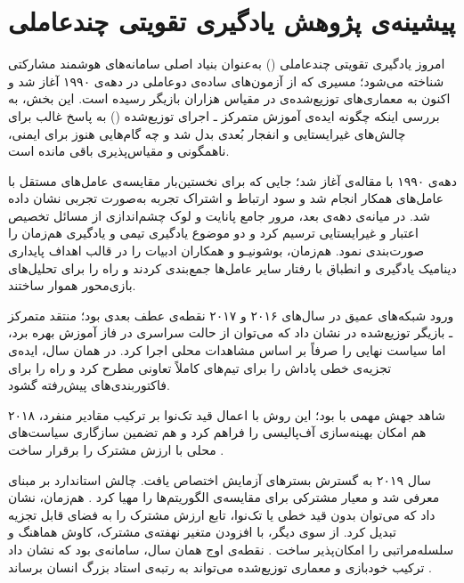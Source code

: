 \section{پیشینه‌ی پژوهش یادگیری تقویتی چندعاملی}\label{sec:marl_lit}

امروز یادگیری تقویتی چندعاملی () به‌عنوان بنیاد اصلی سامانه‌های هوشمند مشارکتی شناخته می‌شود؛ مسیری که از آزمون‌های ساده‌ی دو‌عاملی در دهه‌ی ۱۹۹۰ آغاز شد و اکنون به معماری‌های توزیع‌شده‌ی در مقیاس هزاران بازیگر رسیده است. این بخش، به بررسی اینکه چگونه ایده‌ی {آموزش متمرکز ـ اجرای توزیع‌شده} () به پاسخ غالب برای چالش‌های غیرایستایی و انفجار بُعدی بدل شد و چه گام‌هایی هنوز برای ایمنی، ناهمگونی و مقیاس‌پذیری باقی مانده است.

دهه‌ی ۱۹۹۰ با مقاله‌ی \cite{Tan1993} آغاز شد؛ جایی که برای نخستین‌بار مقایسه‌ی عامل‌های مستقل با عامل‌های همکار انجام شد و سود ارتباط و اشتراک تجربه به‌صورت تجربی نشان داده شد. در میانه‌ی دهه‌ی بعد، مرور جامع پانایت و لوک \cite{Panait2005} چشم‌اندازی از مسائل تخصیص اعتبار و غیرایستایی ترسیم کرد و دو موضوع یادگیری تیمی و یادگیری هم‌زمان را صورت‌بندی نمود.  هم‌زمان، بوشونیـو و همکاران \cite{Busoniu2008} ادبیات  را در قالب اهداف پایداری دینامیک یادگیری و انطباق با رفتار سایر عامل‌ها جمع‌بندی کردند و راه را برای تحلیل‌های بازی‌محور هموار ساختند. 

ورود شبکه‌های عمیق در سال‌های ۲۰۱۶ و ۲۰۱۷ نقطه‌ی عطف بعدی بود؛ منتقد متمرکز ـ بازیگر توزیع‌شده در  \cite{Lowe2017} نشان داد که می‌توان از حالت سراسری در فاز آموزش بهره برد، اما سیاست نهایی را صرفاً بر اساس مشاهدات محلی اجرا کرد.  در همان سال، 
\cite{Sunehag2017} ایده‌ی تجزیه‌ی خطی پاداش را برای تیم‌های کاملاً تعاونی مطرح کرد و راه را برای فاکتوربندی‌های پیش‌رفته گشود. 

۲۰۱۸ شاهد جهش مهمی با  بود؛ این روش با اعمال قید تک‌نوا
 بر ترکیب مقادیر منفرد، هم امکان بهینه‌سازی آف‌پالیسی را فراهم کرد و هم تضمین سازگاری سیاست‌های محلی با ارزش مشترک را برقرار ساخت \cite{Rashid2018}. 

سال ۲۰۱۹ به گسترش بسترهای آزمایش اختصاص یافت. چالش استاندارد
  بر مبنای  معرفی شد و معیار مشترکی برای مقایسه‌ی الگوریتم‌ها را مهیا کرد
  \cite{Samvelyan2019SMAC}.
  هم‌زمان،  \cite{Son2019QTRAN} نشان داد که می‌توان بدون قید خطی یا تک‌نوا، تابع ارزش مشترک را به فضای قابل تجزیه تبدیل کرد. از سوی دیگر،  با افزودن متغیر نهفته‌ی مشترک، کاوش هماهنگ و سلسله‌مراتبی را امکان‌پذیر ساخت \cite{Mahajan2019MAVEN}.  نقطه‌ی اوج همان سال، سامانه‌ی  بود که نشان داد ترکیب خودبازی و معماری توزیع‌شده می‌تواند به رتبه‌ی استاد بزرگ
   انسان برساند \cite{Vinyals2019AlphaStar}. 

